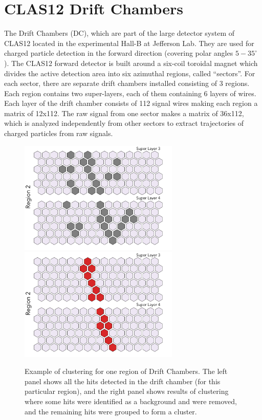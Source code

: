 \section{CLAS12 Drift Chambers}

The Drift Chambers (DC), which are  part of the large detector system of CLAS12 located in the experimental 
Hall-B at Jefferson Lab. They are used for charged particle detection in the forward direction 
(covering polar angles $5-35^\circ$). The CLAS12 forward detector is built around a six-coil 
toroidal magnet which divides the active detection area into six azimuthal regions, called “sectors”. 
For each sector, there are separate drift chambers installed consisting of 3 regions. Each region contains 
two super-layers, each of them containing 6 layers of wires.   Each layer of the drift chamber 
consists of 112 signal wires making each region a matrix of 12x112. The raw signal from 
one sector makes a matrix of 36x112, which is analyzed independently from other sectors
to extract trajectories of charged particles from raw signals. 

 \begin{figure}[!h]
\begin{center}
 \includegraphics[width=3in]{images/dc_region_2_with_noise.pdf}
 \includegraphics[width=3in]{images/dc_region_2_no_noise.pdf}
\caption {Example of clustering for one region of Drift Chambers. The left panel shows 
all the hits detected in the drift chamber (for this particular region), and the right panel 
shows results of clustering where some hits were identified as a background and were removed,
and the remaining hits were grouped to form a cluster.}
 \label{conv:denoising}
 \end{center}
\end{figure}


